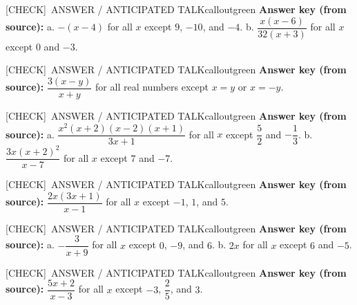 \documentclass[11pt]{article}
\newcommand{\IconCheck}{[CHECK]}
\newcommand{\teacheranswerbox}[2]{%
  \begin{callout}{#1}{calloutgreen}
  #2
  \end{callout}
}
\begin{document}
\teacheranswerbox{\IconCheck\ ANSWER / ANTICIPATED TALK}{%
\textbf{Answer key (from source):} a. \(-(x-4)\) for all \(x\) except \(9\), \(-10\), and \(-4\). b. \(\dfrac{x(x-6)}{32(x+3)}\) for all \(x\) except \(0\) and \(-3\).
}


\teacheranswerbox{\IconCheck\ ANSWER / ANTICIPATED TALK}{%
\textbf{Answer key (from source):} \(\dfrac{3(x-y)}{x+y}\) for all real numbers except \(x=y\) or \(x=-y\).
}


\teacheranswerbox{\IconCheck\ ANSWER / ANTICIPATED TALK}{%
\textbf{Answer key (from source):} a. \(\dfrac{x^2(x+2)(x-2)(x+1)}{3x+1}\) for all \(x\) except \(\dfrac{5}{2}\) and \(-\dfrac{1}{3}\). b. \(\dfrac{3x(x+2)^2}{x-7}\) for all \(x\) except \(7\) and \(-7\).
}


\teacheranswerbox{\IconCheck\ ANSWER / ANTICIPATED TALK}{%
\textbf{Answer key (from source):} \(\dfrac{2x(3x+1)}{x-1}\) for all \(x\) except \(-1\), \(1\), and \(5\).
}


\teacheranswerbox{\IconCheck\ ANSWER / ANTICIPATED TALK}{%
\textbf{Answer key (from source):} a. \(-\dfrac{3}{x+9}\) for all \(x\) except \(0\), \(-9\), and \(6\). b. \(2x\) for all \(x\) except \(6\) and \(-5\).
}


\teacheranswerbox{\IconCheck\ ANSWER / ANTICIPATED TALK}{%
\textbf{Answer key (from source):} \(\dfrac{5x+2}{x-3}\) for all \(x\) except \(-3\), \(\dfrac{2}{5}\), and \(3\).
}
\end{document}
